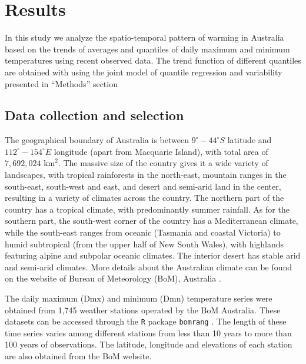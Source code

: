 \documentclass[fleqn,10pt]{wlscirep}
\newcommand{\red}[1]{\textcolor{red}{#1}}
\begin{document}


\section*{Results}
In this study we analyze the spatio-temporal pattern of warming in Australia based on the trends of averages and quantiles of daily maximum and minimum temperatures using recent observed data. The trend function of different quantiles are obtained with using the joint model of quantile regression and variability presented in ``Methods'' section

\subsection*{Data collection and selection}

The geographical boundary of Australia is between $9^{\circ}- 44^{\circ}S$ latitude and  $112^{\circ} - 154^{\circ}E$ longitude (apart from Macquarie Island), with total area of $7,692,024$ $\mathrm{km}^2$. The massive size of the country gives it a wide variety of landscapes, with tropical rainforests in the north-east, mountain ranges in the south-east, south-west and east, and desert and semi-arid land in the center, resulting in a variety of climates across the country.
The northern part of the country has a tropical climate, with predominantly summer rainfall. As for the southern part, the south-west corner of the country has a Mediterranean climate, while the south-east ranges from oceanic (Tasmania and coastal Victoria) to humid subtropical (from the upper half of New South Wales), with highlands featuring alpine and subpolar oceanic climates. The interior desert has stable arid and semi-arid climates. More details about the Australian climate can be found on the website of Bureau of Meteorology (BoM), Australia \cite{ClimateInformation}.

The daily maximum (Dmx) and minimum (Dmn) temperature series were obtained from 1,745 weather stations operated by the BoM Australia. These datasets can be accessed through the \texttt{R} package \texttt{bomrang} \cite{bomrang}. The length of these time series varies among different stations from less than 10 years to more than 100 years of observations. The latitude, longitude and elevations of each station are also obtained from the BoM website.
\end{document}
